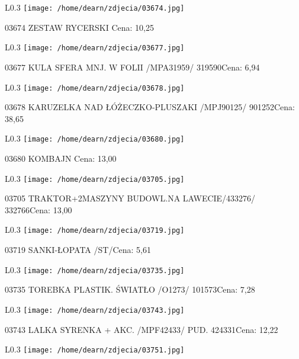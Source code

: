 \begin{wrapfigure}{L}{0.3\textwidth}
\texttt{[image: /home/dearn/zdjecia/03674.jpg]}
\end{wrapfigure}
03674 ZESTAW RYCERSKI Cena: 10,25\newline
\begin{wrapfigure}{L}{0.3\textwidth}
\texttt{[image: /home/dearn/zdjecia/03677.jpg]}
\end{wrapfigure}
03677 KULA SFERA MNJ. W FOLII  /MPA31959/             319590Cena: 6,94\newline
\begin{wrapfigure}{L}{0.3\textwidth}
\texttt{[image: /home/dearn/zdjecia/03678.jpg]}
\end{wrapfigure}
03678 KARUZELKA NAD ŁÓŻECZKO-PLUSZAKI /MPJ90125/      901252Cena: 38,65\newline
\begin{wrapfigure}{L}{0.3\textwidth}
\texttt{[image: /home/dearn/zdjecia/03680.jpg]}
\end{wrapfigure}
03680 KOMBAJN Cena: 13,00\newline
\begin{wrapfigure}{L}{0.3\textwidth}
\texttt{[image: /home/dearn/zdjecia/03705.jpg]}
\end{wrapfigure}
03705 TRAKTOR+2MASZYNY BUDOWL.NA LAWECIE/433276/      332766Cena: 13,00\newline
\begin{wrapfigure}{L}{0.3\textwidth}
\texttt{[image: /home/dearn/zdjecia/03719.jpg]}
\end{wrapfigure}
03719 SANKI-ŁOPATA  /ST/Cena: 5,61\newline
\begin{wrapfigure}{L}{0.3\textwidth}
\texttt{[image: /home/dearn/zdjecia/03735.jpg]}
\end{wrapfigure}
03735 TOREBKA PLASTIK. ŚWIATŁO  /O1273/               101573Cena: 7,28\newline
\begin{wrapfigure}{L}{0.3\textwidth}
\texttt{[image: /home/dearn/zdjecia/03743.jpg]}
\end{wrapfigure}
03743 LALKA SYRENKA + AKC. /MPF42433/  PUD.           424331Cena: 12,22\newline
\begin{wrapfigure}{L}{0.3\textwidth}
\texttt{[image: /home/dearn/zdjecia/03751.jpg]}
\end{wrapfigure}
